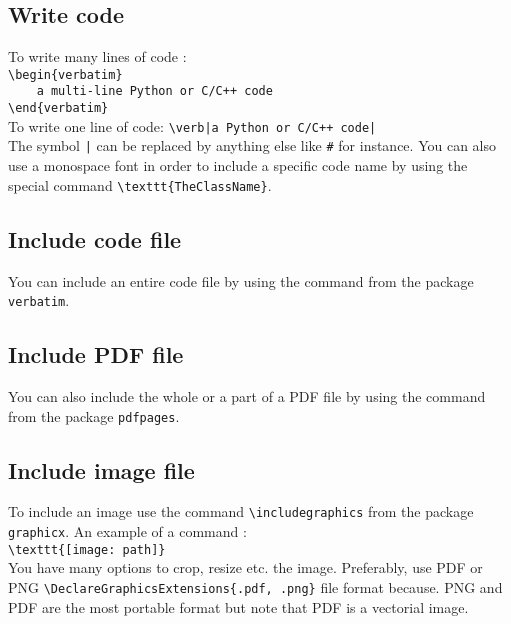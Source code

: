 \documentclass[a4paper, 12pt, oneside]{report}
\begin{document}
\subsection{Write code}
To write many lines of code :\\
\verb|\begin{verbatim}| \\
\verb|    a multi-line Python or C/C++ code| \\
\verb|\end{verbatim}| \\
To write one line of code:
\verb#\verb|a Python or C/C++ code|# \\
The symbol \texttt{|} can be replaced by anything else like \texttt{\#} for instance. You can also use a monospace font in order to include a specific code name by using the special command \verb|\texttt{TheClassName}|.

\subsection{Include code file}
You can include an entire code file by using the command \verb|| from the package \texttt{verbatim}.

\subsection{Include PDF file}
You can also include the whole or a part of a PDF file by using the command\\
\verb||
from the package \texttt{pdfpages}.

\subsection{Include image file}
To include an image use the command \verb|\includegraphics| from the package \texttt{graphicx}. An example of a command : \\
\verb|\texttt{[image: path]}| \\
You have many options to crop, resize etc. the image. Preferably, use PDF or PNG \verb|\DeclareGraphicsExtensions{.pdf, .png}| file format because. PNG and PDF are the most portable format but note that PDF is a vectorial image.
\end{document}
